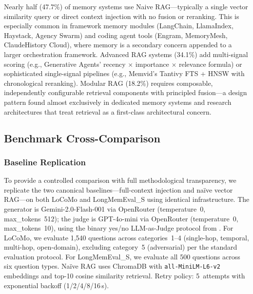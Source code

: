 Nearly half (47.7\%) of memory systems use Naive RAG---typically a single
vector similarity query or direct context injection with no fusion or
reranking. This is especially common in framework memory modules (LangChain,
LlamaIndex, Haystack, Agency Swarm) and coding agent tools (Engram,
MemoryMesh, ClaudeHistory Cloud), where memory is a secondary concern appended
to a larger orchestration framework. Advanced RAG systems (34.1\%) add
multi-signal scoring (e.g., Generative Agents' recency $\times$ importance
$\times$ relevance formula) or sophisticated single-signal pipelines (e.g.,
Memvid's Tantivy FTS + HNSW with chronological reranking). Modular RAG
(18.2\%) requires composable, independently configurable retrieval components
with principled fusion---a design pattern found almost exclusively in dedicated
memory systems and research architectures that treat retrieval as a first-class
architectural concern.

\subsection{Benchmark Cross-Comparison}
\label{sec:benchmark-cross-comparison}



\subsubsection{Baseline Replication}
\label{sec:baseline-replication}

To provide a controlled comparison with full methodological transparency, we
replicate the two canonical baselines---full-context injection and na\"ive
vector RAG---on both LoCoMo and LongMemEval\_S using identical infrastructure.
The generator is Gemini-2.0-Flash-001 via OpenRouter (temperature~0,
max\_tokens~512); the judge is GPT-4o-mini via OpenRouter (temperature~0,
max\_tokens~10), using the binary yes/no LLM-as-Judge protocol from
\cite{maharana2024locomo}.  For LoCoMo, we evaluate 1{,}540 questions across
categories~1--4 (single-hop, temporal, multi-hop, open-domain), excluding
category~5 (adversarial) per the standard evaluation protocol.  For
LongMemEval\_S, we evaluate all 500 questions across six question types.
Na\"ive RAG uses ChromaDB with \texttt{all-MiniLM-L6-v2} embeddings and
top-10 cosine similarity retrieval.  Retry policy: 5~attempts with
exponential backoff (1/2/4/8/16\,s).


